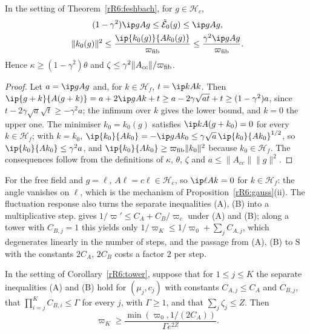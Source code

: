 \begin{proposition}\label{rR6:cbs}
In the setting of Theorem~\textup{\ref{rR6:feshbach}}, for $g\in\mathcal
H_c$,
\begin{gather*}
(1-\gamma^2)\ip g{Ag}\le\tilde{\mathcal E}_0(g)\le\ip g{Ag},\\
\lVert k_0(g)\rVert^2\le\frac{\ip{k_0(g)}{Ak_0(g)}}{\varpi_{\rm fib}}\le
\frac{\gamma^2\ip g{Ag}}{\varpi_{\rm fib}} .
\end{gather*}
Hence $\kappa\ge(1-\gamma^2)\theta$ and $\zeta\le\gamma^2\lVert A_{cc}
\rVert/\varpi_{\rm fib}$.
\end{proposition}

\begin{proof}
Let $a=\ip g{Ag}$ and, for $k\in\mathcal H_f$, $t=\ip k{Ak}$. Then
$\ip{g+k}{A(g+k)}=a+2\ip g{Ak}+t\ge a-2\gamma\sqrt{at}+t\ge(1-\gamma^2)a$,
since $t-2\gamma\sqrt a\sqrt t\ge-\gamma^2a$; the infimum over $k$ gives the
lower bound, and $k=0$ the upper one. The minimiser $k_0=k_0(g)$ satisfies
$\ip k{A(g+k_0)}=0$ for every $k\in\mathcal H_f$; with $k=k_0$, $\ip{k_0}
{Ak_0}=-\ip g{Ak_0}\le\gamma\sqrt a\,\ip{k_0}{Ak_0}^{1/2}$, so $\ip{k_0}{Ak_0}
\le\gamma^2a$, and $\ip{k_0}{Ak_0}\ge\varpi_{\rm fib}\lVert k_0\rVert^2$
because $k_0\in\mathcal H_f$. The consequences follow from the definitions
of $\kappa$, $\theta$, $\zeta$ and $a\le\lVert A_{cc}\rVert\lVert g
\rVert^2$.
\end{proof}

For the free field and $g=\ell$, $A\ell=c\ell\in\mathcal H_c$, so $\ip\ell
{Ak}=0$ for $k\in\mathcal H_f$: the angle vanishes on $\ell$, which is the
mechanism of Proposition~\ref{rR6:gauss}(ii). The fluctuation response also
turns the separate inequalities (A), (B) into a multiplicative step. \cite[Theorem~100(ii)]{BBLR26} gives $1/\varpi'\le C_A+C_B/
\varpi_c$ under (A) and (B); along a tower with $C_{B,j}=1$ this yields only
$1/\varpi_K\le1/\varpi_0+\sum_jC_{A,j}$, which degenerates linearly in the
number of steps, and the passage from (A), (B) to $\mathrm S$ with the
constants $2C_A$, $2C_B$ costs a factor $2$ per step.

\begin{corollary}
\label{rR6:separate}
In the setting of Corollary~\textup{\ref{rR6:tower}}, suppose that for
$1\le j\le K$ the separate inequalities \textup{(A)} and \textup{(B)} hold
for $(\mu_j,c_j)$ with constants $C_{A,j}\le C_A$ and $C_{B,j}$, that
$\prod_{i=j}^KC_{B,i}\le\Gamma$ for every $j$, with $\Gamma\ge1$, and that
$\sum_j\zeta_j\le Z$. Then
\[
\varpi_K\ge\frac{\min(\varpi_0,1/(2C_A))}{\Gamma e^{2Z}} .
\]
\end{corollary}

